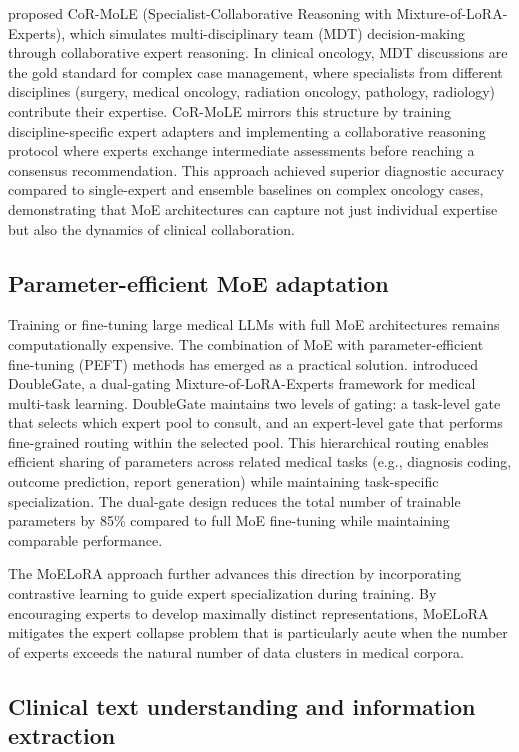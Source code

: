 \cite{chen2026cor_mole} proposed CoR-MoLE (Specialist-Collaborative Reasoning with Mixture-of-LoRA-Experts), which simulates multi-disciplinary team (MDT) decision-making through collaborative expert reasoning. In clinical oncology, MDT discussions are the gold standard for complex case management, where specialists from different disciplines (surgery, medical oncology, radiation oncology, pathology, radiology) contribute their expertise. CoR-MoLE mirrors this structure by training discipline-specific expert adapters and implementing a collaborative reasoning protocol where experts exchange intermediate assessments before reaching a consensus recommendation. This approach achieved superior diagnostic accuracy compared to single-expert and ensemble baselines on complex oncology cases, demonstrating that MoE architectures can capture not just individual expertise but also the dynamics of clinical collaboration.

\subsection*{Parameter-efficient MoE adaptation}

Training or fine-tuning large medical LLMs with full MoE architectures remains computationally expensive. The combination of MoE with parameter-efficient fine-tuning (PEFT) methods has emerged as a practical solution. \cite{wang2025doublegate} introduced DoubleGate, a dual-gating Mixture-of-LoRA-Experts framework for medical multi-task learning. DoubleGate maintains two levels of gating: a task-level gate that selects which expert pool to consult, and an expert-level gate that performs fine-grained routing within the selected pool. This hierarchical routing enables efficient sharing of parameters across related medical tasks (e.g., diagnosis coding, outcome prediction, report generation) while maintaining task-specific specialization. The dual-gate design reduces the total number of trainable parameters by 85\% compared to full MoE fine-tuning while maintaining comparable performance.

The MoELoRA approach \cite{rai2024moe_lora} further advances this direction by incorporating contrastive learning to guide expert specialization during training. By encouraging experts to develop maximally distinct representations, MoELoRA mitigates the expert collapse problem that is particularly acute when the number of experts exceeds the natural number of data clusters in medical corpora.

\subsection*{Clinical text understanding and information extraction}

